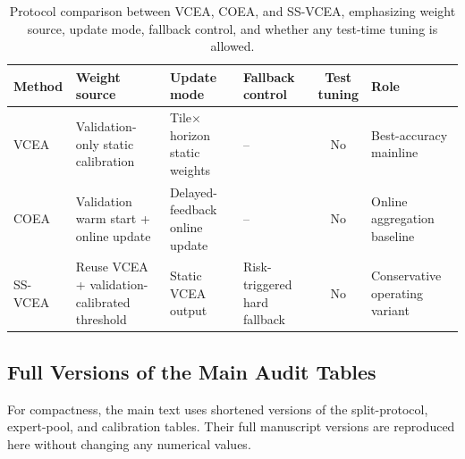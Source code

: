 \documentclass[lettersize,journal]{IEEEtran}
\begin{document}
\begin{table}[!t]
  \centering
  \caption{Protocol comparison between VCEA, COEA, and SS-VCEA, emphasizing weight source, update mode, fallback control, and whether any test-time tuning is allowed.}
  \label{tab:table05}
  \footnotesize
  \begin{adjustbox}{max width=\textwidth}
  \begin{tabular}{p{}p{}p{}p{}cp{}}
    \toprule
    Method & \shortstack{Weight\\source} & \shortstack{Update\\mode} & \shortstack{Fallback\\control} & \shortstack{Test\\tuning} & Role \\
    \midrule
    VCEA & Validation-only static calibration & Tile$\times$horizon static weights & -- & No & Best-accuracy mainline \\
    COEA & Validation warm start + online update & Delayed-feedback online update & -- & No & Online aggregation baseline \\
    SS-VCEA & Reuse VCEA + validation-calibrated threshold & Static VCEA output & Risk-triggered hard fallback & No & Conservative operating variant \\
    \bottomrule
  \end{tabular}
  \end{adjustbox}
\end{table}

\subsection{Full Versions of the Main Audit Tables}
\label{app:e1_e3_full_tables}
For compactness, the main text uses shortened versions of the split-protocol, expert-pool, and calibration tables. Their full manuscript versions are reproduced here without changing any numerical values.
\end{document}
